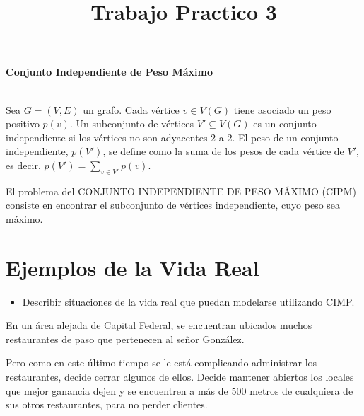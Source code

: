 \documentclass[a4paper, 10pt]{article}
\title{Trabajo Practico 3}
\begin{document}
\maketitle
\newpage

\tableofcontents


\newpage
\begin{large}\textbf{Conjunto Independiente de Peso M\'aximo}\end{large} \\

Sea $G=(V,E)$ un grafo. Cada v\'ertice $v \in V(G)$ tiene asociado un peso positivo $p(v)$. Un subconjunto de v\'ertices $V' \subseteq V(G)$ es un conjunto independiente si los v\'ertices no son adyacentes 2 a 2. El peso de un conjunto independiente, $p(V')$, se define como la suma de los pesos de cada v\'ertice de $V'$, es decir, $p(V')=\sum_{v \in V'} p(v)$.

El problema del CONJUNTO INDEPENDIENTE DE PESO M\'AXIMO (CIPM) consiste en encontrar el subconjunto de v\'ertices independiente, cuyo peso sea m\'aximo.
\section{Ejemplos de la Vida Real}
\begin{itemize}
\item Describir situaciones de la vida real que puedan modelarse utilizando CIMP.
\end{itemize}
En un \'area alejada de Capital Federal, se encuentran ubicados muchos restaurantes de paso que pertenecen al se\~{n}or Gonz\'alez.

Pero como en este \'ultimo tiempo se le est\'a complicando administrar los restaurantes, decide cerrar algunos de ellos.
Decide mantener abiertos los locales que mejor ganancia dejen y se encuentren a m\'as de 500 metros de cualquiera de sus otros restaurantes, para no perder clientes.
\end{document}

